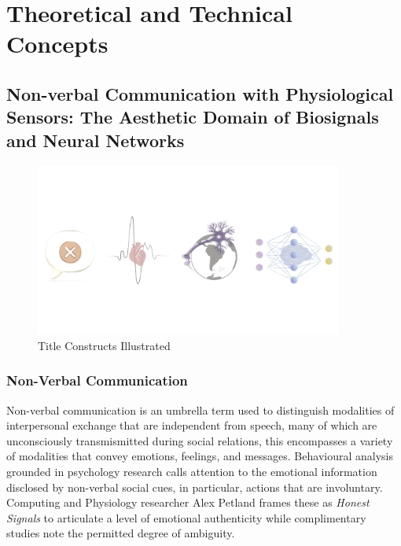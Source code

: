 

\chapter{Theoretical and Technical Concepts}
\label{cha:technical_concepts}

\section{Non-verbal Communication with Physiological Sensors: The Aesthetic Domain of Biosignals and Neural Networks}
\label{subsec:title}

\begin{figure}[htbp]
	\centering
	\includegraphics[width=0.9\textwidth]{Chapters/Figures/background/sec2_title_constructs.001.png}
	\caption{Title Constructs Illustrated}
	\label{fig:Title_Constructs}
\end{figure}


\subsection{Non-Verbal Communication}

Non-verbal communication is an umbrella term used to distinguish modalities of interpersonal exchange that are independent from speech, many of which are unconsciously transmismitted during social relations, this encompasses a variety of modalities that convey emotions, feelings, and messages. Behavioural analysis grounded in psychology research calls attention to the emotional information disclosed by non-verbal social cues, in particular, actions that are involuntary. Computing and Physiology researcher Alex Petland frames these as \textit{Honest Signals} to articulate a level of emotional authenticity while complimentary studies note the permitted degree of ambiguity.

